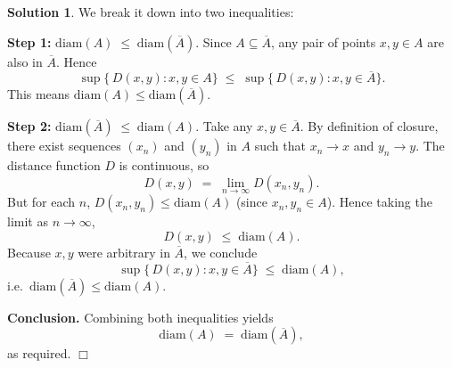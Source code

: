 \documentclass[12pt]{article}
\theoremstyle{definition} %
\newtheorem{solution}{Solution}
\theoremstyle{plain} %
\begin{document}
\begin{solution}
    We break it down into two inequalities:

\medskip
\noindent
\textbf{Step 1:} 
\(
\mathrm{diam}(A) \;\le\; \mathrm{diam}(\overline{A}).
\)
Since $A \subseteq \overline{A}$, any pair of points $x,y \in A$ are also in $\overline{A}$. Hence
\[
\sup\{\,D(x,y)\colon x,y\in A\}
\;\le\;
\sup\{\,D(x,y)\colon x,y\in \overline{A}\}.
\]
This means $\mathrm{diam}(A) \le \mathrm{diam}(\overline{A})$.

\medskip
\noindent
\textbf{Step 2:}
\(
\mathrm{diam}(\overline{A}) \;\le\; \mathrm{diam}(A).
\)
Take any $x,y \in \overline{A}$. By definition of closure, there exist sequences $(x_n)$ and $(y_n)$ in $A$ such that $x_n \to x$ and $y_n \to y$. The distance function $D$ is continuous, so
\[
D(x,y)
\;=\;
\lim_{n\to\infty} D(x_n,y_n).
\]
But for each $n$, $D(x_n,y_n) \le \mathrm{diam}(A)$ (since $x_n,y_n \in A$). Hence taking the limit as $n\to\infty$,
\[
D(x,y)
\;\le\;
\mathrm{diam}(A).
\]
Because $x,y$ were arbitrary in $\overline{A}$, we conclude
\[
\sup\{\,D(x,y)\colon x,y\in \overline{A}\}
\;\le\;
\mathrm{diam}(A),
\]
i.e.\ $\mathrm{diam}(\overline{A}) \le \mathrm{diam}(A)$.

\medskip
\noindent
\textbf{Conclusion.}
Combining both inequalities yields
\[
\mathrm{diam}(A)
\;=\;
\mathrm{diam}(\overline{A}),
\]
as required. \quad $\Box$

\end{solution}
\end{document}
